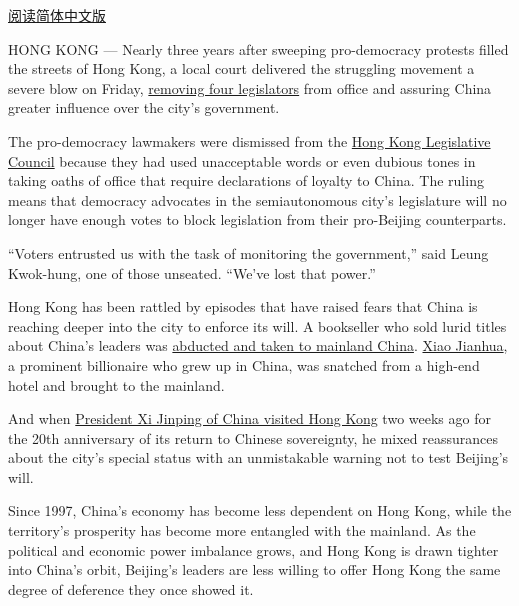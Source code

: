 \href{https://cn.nytimes3xbfgragh.onion/china/20170717/hong-kong-court-pro-democracy-lawmakers/}{阅读简体中文版}

HONG KONG --- Nearly three years after sweeping pro-democracy protests
filled the streets of Hong Kong, a local court delivered the struggling
movement a severe blow on Friday,
\href{http://www.nytimes3xbfgragh.onion/2016/12/02/world/asia/hong-kong-lawmakers-democracy.html}{removing
four legislators} from office and assuring China greater influence over
the city's government.

The pro-democracy lawmakers were dismissed from the
\href{http://www.legco.gov.hk/index.html}{Hong Kong Legislative Council}
because they had used unacceptable words or even dubious tones in taking
oaths of office that require declarations of loyalty to China. The
ruling means that democracy advocates in the semiautonomous city's
legislature will no longer have enough votes to block legislation from
their pro-Beijing counterparts.

``Voters entrusted us with the task of monitoring the government,'' said
Leung Kwok-hung, one of those unseated. ``We've lost that power.''

Hong Kong has been rattled by episodes that have raised fears that China
is reaching deeper into the city to enforce its will. A bookseller who
sold lurid titles about China's leaders was
\href{https://www.nytimes3xbfgragh.onion/2016/11/05/world/asia/hong-kong-china-booksellers-pen.html}{abducted
and taken to mainland China}.
\href{https://www.nytimes3xbfgragh.onion/2017/02/10/world/asia/xiao-jianhua-hong-kong-disappearance.html}{Xiao
Jianhua}, a prominent billionaire who grew up in China, was snatched
from a high-end hotel and brought to the mainland.

And when
\href{https://www.nytimes3xbfgragh.onion/2017/07/01/world/asia/hong-kong-china-xi-jinping.html}{President
Xi Jinping of China visited Hong Kong} two weeks ago for the 20th
anniversary of its return to Chinese sovereignty, he mixed reassurances
about the city's special status with an unmistakable warning not to test
Beijing's will.

Since 1997, China's economy has become less dependent on Hong Kong,
while the territory's prosperity has become more entangled with the
mainland. As the political and economic power imbalance grows, and Hong
Kong is drawn tighter into China's orbit, Beijing's leaders are less
willing to offer Hong Kong the same degree of deference they once showed
it.

